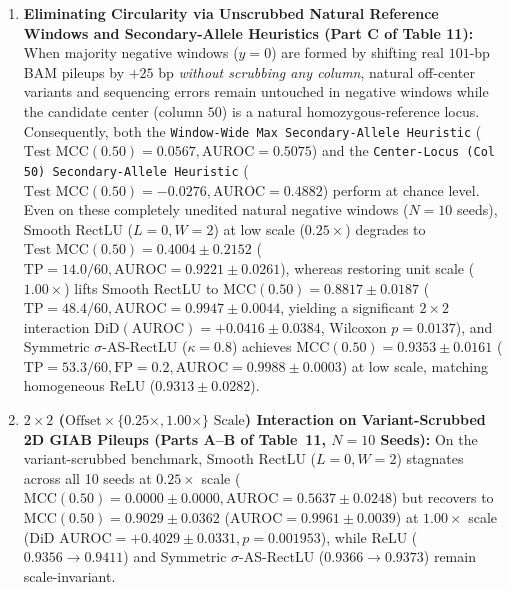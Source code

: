 \documentclass[11pt, a4paper]{article}
\begin{document}
\begin{enumerate}
    \item \textbf{Eliminating Circularity via Unscrubbed Natural Reference Windows and Secondary-Allele Heuristics (Part C of Table 11):} When majority negative windows ($y=0$) are formed by shifting real $101$-bp BAM pileups by $+25$ bp \textit{without scrubbing any column}, natural off-center variants and sequencing errors remain untouched in negative windows while the candidate center (column $50$) is a natural homozygous-reference locus. Consequently, both the \texttt{Window-Wide Max Secondary-Allele Heuristic} ($\text{Test MCC}(0.50) = 0.0567, \text{AUROC} = 0.5075$) and the \texttt{Center-Locus (Col 50) Secondary-Allele Heuristic} ($\text{Test MCC}(0.50) = -0.0276, \text{AUROC} = 0.4882$) perform at chance level. Even on these completely unedited natural negative windows ($N=10$ seeds), Smooth RectLU ($L=0, W=2$) at low scale ($0.25\times$) degrades to $\text{Test MCC}(0.50) = 0.4004 \pm 0.2152$ ($\text{TP}=14.0/60, \text{AUROC}=0.9221 \pm 0.0261$), whereas restoring unit scale ($1.00\times$) lifts Smooth RectLU to $\text{MCC}(0.50) = 0.8817 \pm 0.0187$ ($\text{TP}=48.4/60, \text{AUROC}=0.9947 \pm 0.0044$, yielding a significant $2 \times 2$ interaction $\text{DiD}(\text{AUROC}) = +0.0416 \pm 0.0384$, Wilcoxon $p = 0.0137$), and Symmetric $\sigma$-AS-RectLU ($\kappa=0.8$) achieves $\text{MCC}(0.50) = 0.9353 \pm 0.0161$ ($\text{TP}=53.3/60, \text{FP}=0.2, \text{AUROC}=0.9988 \pm 0.0003$) at low scale, matching homogeneous ReLU ($0.9313 \pm 0.0282$).
    \item \textbf{$2 \times 2$ ($\text{Offset} \times \{0.25\times, 1.00\times\}\text{ Scale}$) Interaction on Variant-Scrubbed 2D GIAB Pileups (Parts A--B of Table~11, $N=10$ Seeds):} On the variant-scrubbed benchmark, Smooth RectLU ($L=0, W=2$) stagnates across all 10 seeds at $0.25\times$ scale ($\text{MCC}(0.50) = 0.0000 \pm 0.0000, \text{AUROC} = 0.5637 \pm 0.0248$) but recovers to $\text{MCC}(0.50) = 0.9029 \pm 0.0362$ ($\text{AUROC} = 0.9961 \pm 0.0039$) at $1.00\times$ scale ($\text{DiD AUROC} = +0.4029 \pm 0.0331, p = 0.001953$), while ReLU ($0.9356 \to 0.9411$) and Symmetric $\sigma$-AS-RectLU ($0.9366 \to 0.9373$) remain scale-invariant.
\end{enumerate}
\end{document}

